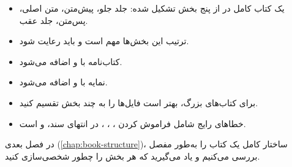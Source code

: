 \begin{itemize}
    \item یک کتاب کامل در  از پنج
    بخش تشکیل شده: جلد جلو، پیش‌متن، متن اصلی،
    پس‌متن، جلد عقب.

    \item ترتیب این بخش‌ها مهم است و باید رعایت
    شود.

    \item کتاب‌نامه با  و
     اضافه می‌شود.

    \item نمایه با  و 
    اضافه می‌شود.

    \item برای کتاب‌های بزرگ، بهتر است فایل‌ها
    را به چند بخش تقسیم کنید.

    \item خطاهای رایج شامل فراموش کردن
    ، ،
    ،  در
    انتهای سند، و  است.
\end{itemize}

در فصل بعدی (\cref{chap:book-structure})،
ساختار کامل یک کتاب را به‌طور مفصل بررسی
می‌کنیم و یاد می‌گیرید که هر بخش را چطور
شخصی‌سازی کنید.